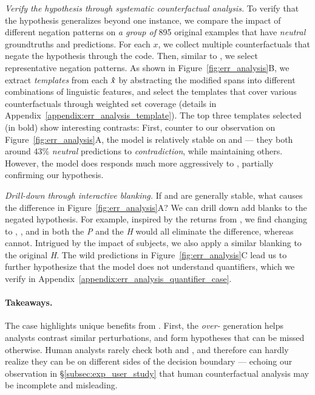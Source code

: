 \emph{Verify the hypothesis through systematic counterfactual analysis.}
To verify that the hypothesis generalizes beyond one instance, we compare the impact of different negation patterns on \emph{a group of} 895 original examples that have \emph{neutral} groundtruths and predictions.
For each $x$, we collect multiple counterfactuals that negate the hypothesis through the  code.
Then, similar to \citet{wu2020tempura}, we select representative negation patterns.
As shown in Figure~\ref{fig:err_analysis}B, we extract \emph{templates} from each $\hat{x}$ by abstracting the modified spans into different combinations of linguistic features, and select the templates that cover various counterfactuals through weighted set coverage (details in Appendix~\ref{appendix:err_analysis_template}).
The top three templates selected (in bold) show interesting contrasts:
First, counter to our observation on Figure~\ref{fig:err_analysis}A, the model is relatively stable on  and  --- they both around 43\% \emph{neutral} predictions to \emph{contradiction}, while maintaining others.
However, the model does responds much more aggressively to , partially confirming our hypothesis.

\emph{Drill-down through interactive blanking.}
If  and  are generally stable, what causes the difference in Figure~\ref{fig:err_analysis}A?
We can drill down add blanks to the negated hypothesis.
For example, inspired by the returns from , we find changing  to , , and  in both the \emph{P} and the \emph{H} would all eliminate the difference, whereas  cannot.
Intrigued by the impact of subjects, we also apply a similar blanking to the original \emph{H}.
The wild predictions in Figure~\ref{fig:err_analysis}C lead us to further hypothesize that the model does not understand quantifiers, which we verify in Appendix~\ref{appendix:err_analysis_quantifier_case}.


\paragraph{Takeaways.}
The case highlights unique benefits from \sysname.
First, the \emph{over-} generation helps analysts contrast similar perturbations, and form hypotheses that can be missed otherwise.
Human analysts rarely check both  and , and therefore can hardly realize they can be on different sides of the decision boundary --- echoing our observation in \S\ref{subsec:exp_user_study} that human counterfactual analysis may be incomplete and misleading.

